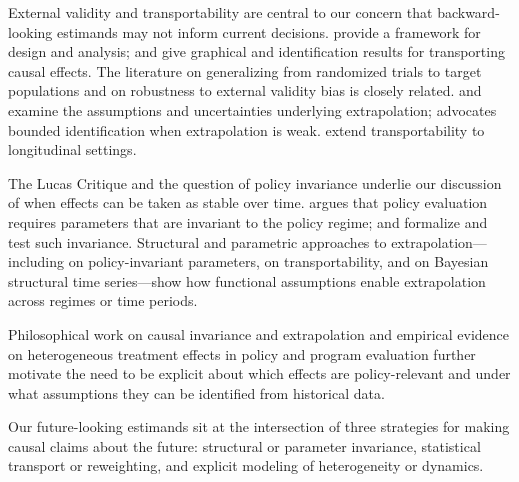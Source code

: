 \documentclass{article}
\begin{document}
External validity and transportability are central to our concern that backward-looking estimands may not inform current decisions. \citet{egamiElementsExternalValidity2023} provide a framework for design and analysis; \citet{pearlExternalValidityCalculus2022} and \citet{bareinboimTransportabilityCausalEffects2012} give graphical and identification results for transporting causal effects. The literature on generalizing from randomized trials to target populations \citep{coleGeneralizingEvidenceRandomized2010,tiptonImprovingGeneralizationsExperiments2013} and on robustness to external validity bias \citep{devauxQuantifyingRobustnessExternal2022} is closely related. \citet{khosrowiExtrapolationCausalEffects2019} and \citet{khosrowiExtrapolatingExperimentsConfidently2023} examine the assumptions and uncertainties underlying extrapolation; \citet{manskiPublicPolicyUncertain2013} advocates bounded identification when extrapolation is weak. \citet{shpitserCounterfactualGraphicalModels2013} extend transportability to longitudinal settings.

The Lucas Critique and the question of policy invariance underlie our discussion of when effects can be taken as stable over time. \citet{lucasjrEconometricPolicyEvaluation1976} argues that policy evaluation requires parameters that are invariant to the policy regime; \citet{ericssonExogeneityCointegrationEconomic1998} and \citet{estrellaAreDeepParameters1999} formalize and test such invariance. Structural and parametric approaches to extrapolation---including \citet{heckmanStructuralEquationsTreatment2005} on policy-invariant parameters, \citet{pearlExternalValidityCalculus2022} on transportability, and \citet{brodersenInferringCausalImpact2015} on Bayesian structural time series---show how functional assumptions enable extrapolation across regimes or time periods.

Philosophical work on causal invariance and extrapolation \citep{cartwrightHuntingCausesUsing2007} and empirical evidence on heterogeneous treatment effects in policy and program evaluation \citep{gablerDealingHeterogeneityTreatment2009,cintronHeterogeneousTreatmentEffects2022} further motivate the need to be explicit about which effects are policy-relevant and under what assumptions they can be identified from historical data.

Our future-looking estimands sit at the intersection of three strategies for making causal claims about the future: structural or parameter invariance, statistical transport or reweighting, and explicit modeling of heterogeneity or dynamics.
\end{document}
